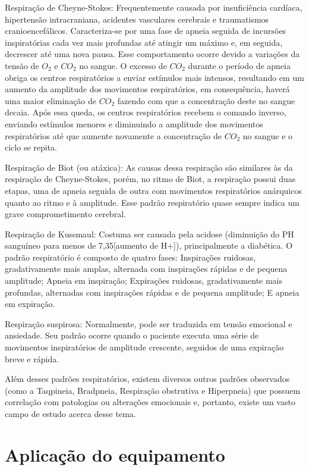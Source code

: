 	Respiração de Cheyne-Stokes: Frequentemente causada por insuficiência cardíaca, hipertensão intracraniana, acidentes vasculares cerebrais e traumatismos cranioencefálicos. Caracteriza-se por uma fase de apneia seguida de incursões inspiratórias cada vez mais profundas até atingir um máximo e, em seguida, decrescer até uma nova pausa. Esse comportamento ocorre devido a variações da tensão de $O_2$ e $CO_2$ no sangue. O excesso de $CO_2$ durante o período de apneia obriga os centros respiratórios a enviar estímulos mais intensos, resultando em um aumento da amplitude dos movimentos respiratórios, em consequência, haverá uma maior eliminação de $CO_2$ fazendo com que a concentração deste no sangue decaia. Após essa queda, os centros respiratórios recebem o comando inverso, enviando estímulos menores e diminuindo a amplitude dos movimentos respiratórios até que aumente novamente a concentração de $CO_2$ no sangue e o ciclo se repita.
	
	Respiração de Biot (ou atáxica): As causas dessa respiração são similares às da respiração de Cheyne-Stokes, porém, no ritmo de Biot, a respiração possui duas etapas, uma de apneia seguida de outra com movimentos respiratórios anárquicos quanto ao ritmo e à amplitude. Esse padrão respiratório quase sempre indica um grave comprometimento cerebral.
	
	Respiração de Kussmaul: Costuma ser causada pela acidose (diminuição do PH sanguíneo para menos de 7,35[aumento de H+]), principalmente a diabética. O padrão respiratório é composto de quatro fases: Inspirações ruidosas, gradativamente mais amplas, alternada com inspirações rápidas e de pequena amplitude; Apneia em inspiração; Expirações ruidosas, gradativamente mais profundas, alternadas com inspirações rápidas e de pequena amplitude;	
	E apneia em expiração.
	
	Respiração suspirosa: Normalmente, pode ser traduzida em tensão emocional e ansiedade. Seu padrão ocorre quando o paciente executa uma série de movimentos inspiratórios de amplitude crescente, seguidos de uma expiração breve e rápida.
	
	Além desses padrões respiratórios, existem diversos outros padrões observados (como a Taqpineia, Bradpneia, Respiração obstrutiva e Hiperpneia) que possuem correlação com patologias ou alterações emocionais e, portanto, existe um vasto campo de estudo acerca desse tema.
	
\section{Aplicação do equipamento}

